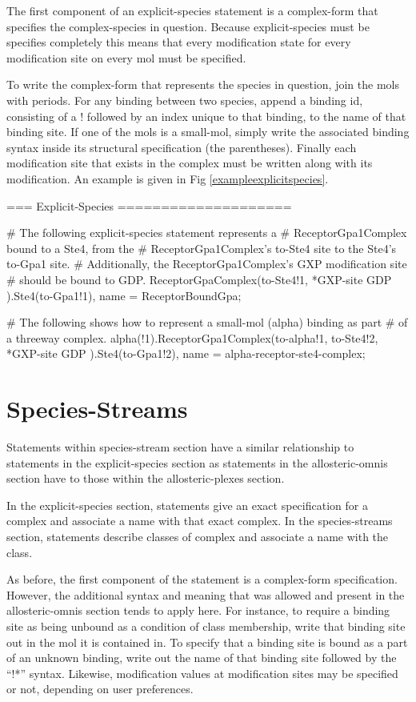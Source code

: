The first component of an explicit-species statement is a complex-form
that specifies the complex-species in question.  Because
explicit-species must be specifies completely this means that every
modification state for every modification site on every mol must be
specified.  

To write the complex-form that represents the species in question,
join the mols with periods.  For any binding between two species,
append a binding id, consisting of a ! followed by an index unique to
that binding, to the name of that binding site.  If one of the mols is
a small-mol, simply write the associated binding syntax inside its
structural specification (the parentheses).  Finally each modification
site that exists in the complex must be written along with its
modification.  An example is given in Fig
\ref{exampleexplicitspecies}.

\begin{ExampleMZR}[label=exampleexplicitspecies]
=== Explicit-Species ====================

    # The following explicit-species statement represents a
    # ReceptorGpa1Complex bound to a Ste4, from the
    # ReceptorGpa1Complex's to-Ste4 site to the Ste4's to-Gpa1 site.
    # Additionally, the ReceptorGpa1Complex's GXP modification site
    # should be bound to GDP.
    ReceptorGpaComplex(to-Ste4!1, *GXP-site { GDP } ).Ste4(to-Gpa1!1), 
        name = ReceptorBoundGpa;

    # The following shows how to represent a small-mol (alpha) binding as part
    # of a threeway complex.
    alpha(!1).ReceptorGpa1Complex(to-alpha!1, to-Ste4!2, *GXP-site {GDP} ).Ste4(to-Gpa1!2),
        name = alpha-receptor-ste4-complex;
\end{ExampleMZR}


\section{Species-Streams}
Statements within species-stream section have a similar relationship
to statements in the explicit-species section as statements in the
allosteric-omnis section have to those within the allosteric-plexes section.

In the explicit-species section, statements give an exact
specification for a complex and associate a name with that exact
complex.  In the species-streams section, statements describe classes
of complex and associate a name with the class.

As before, the first component of the statement is a complex-form
specification.  However, the additional syntax and meaning that was
allowed and present in the allosteric-omnis section tends to apply
here.  For instance, to require a binding site as being unbound as a
condition of class membership, write that binding site out in the mol
it is contained in.  To specify that a binding site is bound as a part
of an unknown binding, write out the name of that binding site
followed by the ``!*'' syntax. Likewise, modification values at
modification sites may be specified or not, depending on user
preferences.  

